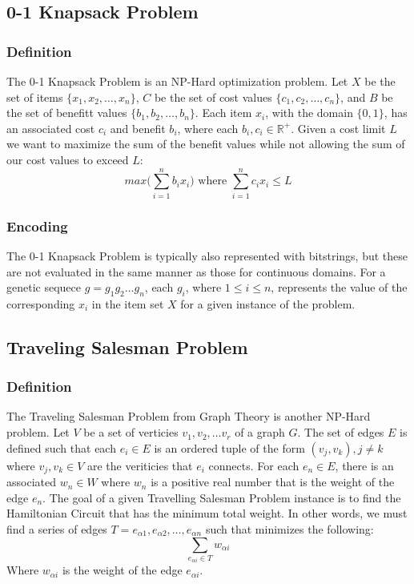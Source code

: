 %
%
\subsection*{0-1 Knapsack Problem}
\subsubsection*{Definition}

The 0-1 Knapsack Problem is an NP-Hard optimization problem. Let $X$ be the set of items $\{x_1, x_2, \ldots, x_n\}$, $C$ be the set of cost values $\{c_1, c_2, \ldots, c_n\}$, and $B$ be the set of benefitt values $\{b_1, b_2, \ldots, b_n\}$. Each item $x_i$, with the domain $\{0,1\}$, has an associated cost $c_i$ and benefit $b_i$, where each $b_i,c_i \in \mathbb{R}^{+}$. Given a cost limit $L$ we want to maximize the sum of the benefit values while not allowing the sum of our cost values to exceed $L$:
\[ max\big( \sum\limits_{i = 1}^{n} b_ix_i \big) \text{ where } \sum\limits_{i = 1}^{n} c_ix_i \leq L \]

\subsubsection*{Encoding}
The  0-1 Knapsack Problem is typically also represented with bitstrings, but these are not evaluated in the same manner as those for continuous domains. For a genetic sequece $g = g_1 g_2 \ldots g_n$, each $g_i$, where $1 \leq i \leq n$, represents the value of the corresponding $x_i$ in the item set $X$ for a given instance of the problem. 

%
%
\subsection*{Traveling Salesman Problem}
\subsubsection*{Definition}
The Traveling Salesman Problem from Graph Theory is another NP-Hard problem. Let $V$ be a set of verticies $v_1, v_2, \ldots v_r$ of a graph $G$. The set of edges $E$ is defined such that each $e_i \in E$ is an ordered tuple of the form $(v_j,v_k), j \not = k$ where $v_j,v_k \in V$ are the veriticies that $e_i$ connects. For each $e_n \in E$, there is an associated $w_n \in W$ where $w_n$ is a positive real number that is the weight of the edge $e_n$. The goal of a given Travelling Salesman Problem instance is to find the Hamiltonian Circuit that has the minimum total weight. In other words, we must find a series of edges $T = e_{\alpha 1},e_{\alpha 2},\ldots,e_{\alpha n}$ such that minimizes the following\cite{Haxhimusa11}:
\[\sum\limits_{e_{\alpha i} \in T} w_{\alpha i}\]
\noindent Where $w_{\alpha i}$ is the weight of the edge $e_{\alpha i}$.

